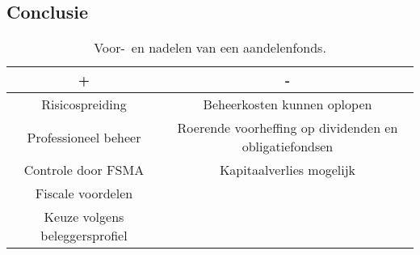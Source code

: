 \subsection{Conclusie}


\begin{table}[!htbp]
	\centering
		\begin{tabular}{c|c}
			\toprule
			
			 \cellcolor{lightgray}            +              &  \cellcolor{lightgray}                                      -                                        \\ \midrule
			 Risicospreiding   & Beheerkosten kunnen oplopen          \\ \hline
			  Professioneel beheer  & Roerende voorheffing op dividenden en obligatiefondsen \\ \hline
			Controle door FSMA & Kapitaalverlies mogelijk \\ \hline
			       Fiscale voordelen &   \\ \hline
			       Keuze volgens beleggersprofiel &   \\ \bottomrule
		\end{tabular}
	\caption{Voor-~en nadelen van een aandelenfonds.}
	\label{tab:voordelenennadelenaandelenfonds1}
\end{table}


